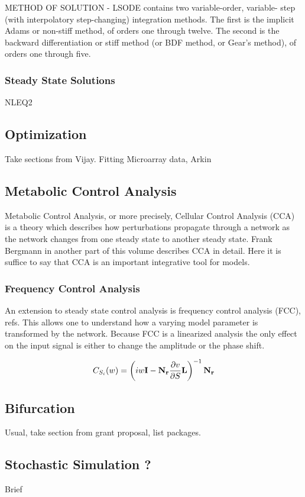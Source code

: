 METHOD OF SOLUTION - LSODE contains two variable-order, variable-
step (with interpolatory step-changing) integration methods. The
first is the implicit Adams or non-stiff method, of orders one
through twelve. The second is the backward differentiation or
stiff method (or BDF method, or Gear's method), of orders one
through five.

\subsubsection{Steady State Solutions}

NLEQ2

\subsection{Optimization}

Take sections from Vijay. Fitting Microarray data, Arkin

\subsection{Metabolic Control Analysis}

Metabolic Control Analysis, or more precisely, Cellular Control Analysis (CCA) is
a theory which describes how perturbations propagate through a network as the
network changes from one steady state to another steady state. Frank Bergmann in another part of this volume describes CCA in detail. Here it is suffice to say that CCA is an important
integrative tool for models.

\subsubsection{Frequency Control Analysis}

An extension to steady state control analysis is frequency control analysis (FCC), refs. This allows one to understand how a varying model parameter is transformed by the network. Because
FCC is a linearized analysis the only effect on the input signal is either to change
the amplitude or the phase shift.

$$ C_{S_i} (w) = \left( iw {\bf I} - {\bf N_r} \frac{\partial v}{\partial S} {\bf L} \right)^{-1} {\bf N_r} $$

\subsection{Bifurcation}

Usual, take section from grant proposal, list packages.

\subsection{Stochastic Simulation ?}

Brief
